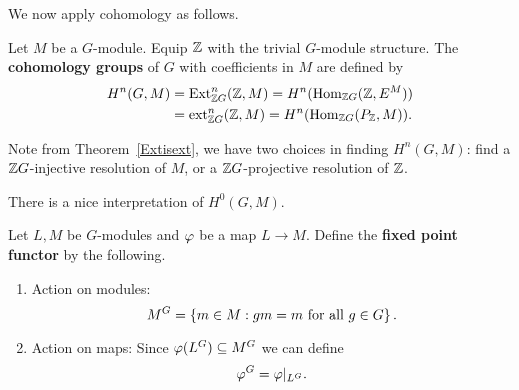 We now apply cohomology as follows.
\begin{df}
Let $M$ be a $G$-module. 
Equip $\mathbb{Z}$ with the trivial $G$-module structure.
The \textbf{cohomology groups} of $G$ with coefficients in $M$ are defined by
\begin{align*}
H^n(G,M)&=\operatorname{Ext}^n_{\mathbb{Z} G}(\mathbb{Z}, M)=H^n(\operatorname{Hom}_{\mathbb{Z} G} (\mathbb{Z}, E^M))\\
&=\operatorname{ext}^n_{\mathbb{Z} G}(\mathbb{Z}, M)=H^n(\operatorname{Hom}_{\mathbb{Z} G} (P_{\mathbb{Z}}, M)).
\end{align*}
\end{df}
Note from Theorem~\ref{Extisext}, we have two choices in finding $H^n(G, M)$: find a $\mathbb{Z} G$-injective resolution of $M$, or a $\mathbb{Z} G$-projective resolution of $\mathbb{Z}$. %

There is a nice interpretation of $H^0(G,M)$.
\begin{df}
Let $L,M$ be $G$-modules and $\varphi$ be a map $L\to M$. Define the \textbf{fixed point functor} by the following.
\begin{enumerate}
\item Action on modules:
\[
M^G=\left\{{m\in M}:{gm=m\text{ for all }g\in G}\right\}.
\]
\item Action on maps: Since $\varphi(L^G)\subseteq M^G$ we can define
\[
\varphi^G=\varphi|_{L^G}.
\]
\end{enumerate}
\end{df}

